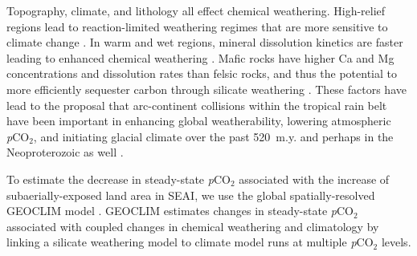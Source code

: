 \documentclass[9pt,twocolumn,twoside,lineno]{pnas-new}
\newcommand{\pCOtwo}{\textit{p}CO$_{2}$\xspace}
\begin{document}
Topography, climate, and lithology all effect chemical weathering. High-relief regions lead to reaction-limited weathering regimes that are more sensitive to climate change \cite{Gabet2009a, West2012a}. In warm and wet regions, mineral dissolution kinetics are faster leading to enhanced chemical weathering \cite{West2012a}. Mafic rocks have higher Ca and Mg concentrations and dissolution rates than felsic rocks, and thus the potential to more efficiently sequester carbon through silicate weathering \cite{Dessert2003a}. These factors have lead to the proposal that arc-continent collisions within the tropical rain belt have been important in enhancing global weatherability, lowering atmospheric \pCOtwo, and initiating glacial climate over the past 520~m.y. \cite{Jagoutz2016a, Swanson-Hysell2017a, Macdonald2019a} and perhaps in the Neoproterozoic as well \cite{Park2019b}.

To estimate the decrease in steady-state \pCOtwo associated with the increase of subaerially-exposed land area in SEAI, we use the global spatially-resolved GEOCLIM model \cite{Godderis2017c}. GEOCLIM estimates changes in steady-state \pCOtwo associated with coupled changes in chemical weathering and climatology by linking a silicate weathering model to climate model runs at multiple \pCOtwo levels.
\end{document}
